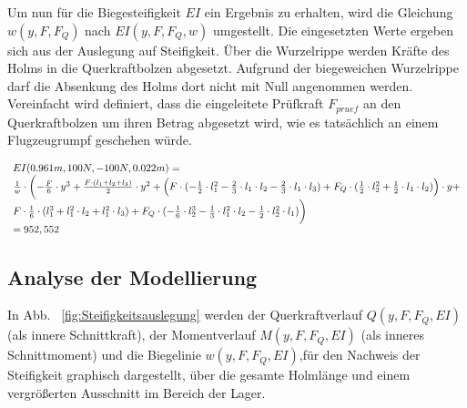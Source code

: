 \noindent Um nun für die Biegesteifigkeit $EI$ ein Ergebnis zu erhalten, wird die Gleichung $w(y,F,F_{Q})$ nach $EI(y,F,F_{Q},w)$ umgestellt. Die eingesetzten Werte ergeben sich aus der Auslegung auf Steifigkeit. Über die Wurzelrippe werden Kräfte des Holms in die Querkraftbolzen abgesetzt. Aufgrund der biegeweichen Wurzelrippe darf die Absenkung des Holms dort nicht mit Null angenommen werden. Vereinfacht wird definiert, dass die eingeleitete Prüfkraft $F_{pruef}$ an den Querkraftbolzen um ihren Betrag abgesetzt wird, wie es tatsächlich an einem Flugzeugrumpf geschehen würde. 

\begin{equation}
	\begin{array}{l}
		EI(0.961m, 100N, -100N, 0.022m)= \\
		\frac{1}{w}\cdot\biggl(-\frac{F}{6}\cdot y^{3} + \frac{ F\cdot (l_{1}+l_{2}+l_{3})}{2}\cdot y^{2} + \Bigl(F\cdot(-\frac{1}{2}\cdot l_{1}^{2} -\frac{2}{3}\cdot l_{1}\cdot l_{2}-\frac{2}{3}\cdot l_{1}\cdot l_{3}) +		F_{Q}\cdot(\frac{1}{2}\cdot l_{2}^{2}+\frac{1}{2}\cdot l_{1}\cdot l_{2})\Bigr)\cdot y +\\
		F\cdot\frac{1}{6}\cdot(l_{1}^{3}+l_{1}^{2}\cdot l_{2}+l_{1}^{2}\cdot l_{3}) + F_{Q}\cdot(-\frac{1}{6}\cdot l_{2}^{3}-\frac{1}{3}\cdot l_{1}^{2}\cdot l_{2}-\frac{1}{2}\cdot l_{2}^{2}\cdot l_{1})\biggr)\\
		=952,552
	\end{array}
\end{equation}

\subsection{Analyse der Modellierung}
In Abb. ~\ref{fig:Steifigkeitsauslegung} werden der Querkraftverlauf $Q(y,F,F_{Q},EI)$ (als innere Schnittkraft), der Momentverlauf $M(y,F,F_{Q},EI)$ (als inneres Schnittmoment) und die Biegelinie $	w(y,F,F_{Q},EI)$,für den Nachweis der Steifigkeit graphisch dargestellt, über die gesamte Holmlänge und einem vergrößerten Ausschnitt im Bereich der Lager. \\

